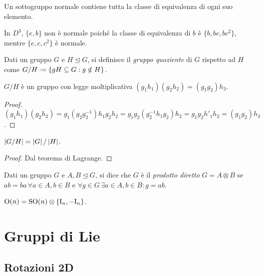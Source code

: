 Un sottogruppo normale contiene tutta la classe di equivalenza di ogni suo elemento.

\begin{example}
	In $ D^3 $, $ \{e,b\} $ non è normale poiché la classe di equivalenza di $ b $ è $ \{b,bc,bc^2\} $, mentre $ \{e,c,c^2\} $ è normale.
\end{example}

\begin{definition}
	Dati un gruppo $ G $ e $ H \trianglelefteq G $, si definisce il \textit{gruppo quoziente} di $ G $ rispetto ad $ H $ come $ G / H \defeq \{gH \subseteq G : g \notin H\} $.
\end{definition}

\begin{proposition}
	$ G / H $ è un gruppo con legge moltiplicativa $ (g_1 h_1) (g_2 h_2) = (g_1 g_2) h_3 $.
\end{proposition}
\begin{proof}
	$ (g_1 h_1) (g_2 h_2) = g_1 (g_2 g_2^{-1}) h_1 g_2 h_2 = g_1 g_2 (g_2^{-1} h_1 g_2) h_2 = g_1 g_2 h'_1 h_2 = (g_1 g_2) h_3 $.
\end{proof}

\begin{proposition}
	$ \left\lvert G / H\right\rvert = \left\lvert G\right\rvert / \left\lvert H\right\rvert $.
\end{proposition}
\begin{proof}
	Dal teorema di Lagrange.
\end{proof}

\begin{definition}
	Dati un gruppo $ G $ e $ A,B \trianglelefteq G $, si dice che $ G $ è il \textit{prodotto diretto} $ G = A \otimes B $ se $ ab = ba \,\forall a \in A,b \in B $ e $ \forall g \in G \,\exists a \in A, b \in B : g = ab $.
\end{definition}

\begin{example}
	$ \mathrm{O}(n) = \mathrm{SO}(n) \otimes \{\mathrm{I}_n, -\mathrm{I}_n\} $.
\end{example}

\section{Gruppi di Lie}

\subsection{Rotazioni 2D}


